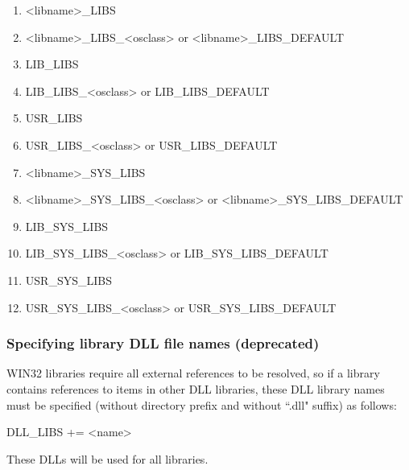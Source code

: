 \begin{enumerate}\item \textless{}libname\textgreater{}\_LIBS

\item \textless{}libname\textgreater{}\_LIBS\_\textless{}osclass\textgreater{} or \textless{}libname\textgreater{}\_LIBS\_DEFAULT

\item {}LIB\_LIBS

\item LIB\_LIBS\_\textless{}osclass\textgreater{} or LIB\_LIBS\_DEFAULT

\item {}USR\_LIBS

\item USR\_LIBS\_\textless{}osclass\textgreater{} or USR\_LIBS\_DEFAULT

\item \textless{}libname\textgreater{}\_SYS\_LIBS

\item \textless{}libname\textgreater{}\_SYS\_LIBS\_\textless{}osclass\textgreater{} or \textless{}libname\textgreater{}\_SYS\_LIBS\_DEFAULT

\item {}LIB\_SYS\_LIBS

\item LIB\_SYS\_LIBS\_\textless{}osclass\textgreater{} or LIB\_SYS\_LIBS\_DEFAULT

\item {}USR\_SYS\_LIBS

\item USR\_SYS\_LIBS\_\textless{}osclass\textgreater{} or USR\_SYS\_LIBS\_DEFAULT

\end{enumerate}\subsubsection{Specifying library DLL file names (deprecated)}

WIN32 libraries require all external references to be resolved, so if a library contains references to items in other DLL 
libraries, these DLL library names must be specified (without directory prefix and without ``.dll" suffix) as follows:

\begin{description}\item {}DLL\_LIBS += \textless{}name\textgreater{}

\end{description}These DLLs will be used for all libraries.

